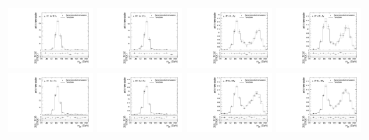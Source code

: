 \begin{figure}[htbp]
  \includegraphics[width=0.2\textwidth]{fig/analysis/templateVsReco_res_r0_MJ_mu_HP_vbf_LDy.pdf}
  \includegraphics[width=0.2\textwidth]{fig/analysis/templateVsReco_res_r0_MJ_e_HP_vbf_LDy.pdf}
  \includegraphics[width=0.2\textwidth]{fig/analysis/templateVsReco_res_r0_MJ_mu_LP_vbf_LDy.pdf}
  \includegraphics[width=0.2\textwidth]{fig/analysis/templateVsReco_res_r0_MJ_e_LP_vbf_LDy.pdf}\\
  \includegraphics[width=0.2\textwidth]{fig/analysis/templateVsReco_res_r0_MJ_mu_HP_bb_HDy.pdf}
  \includegraphics[width=0.2\textwidth]{fig/analysis/templateVsReco_res_r0_MJ_e_HP_bb_HDy.pdf}
  \includegraphics[width=0.2\textwidth]{fig/analysis/templateVsReco_res_r0_MJ_mu_LP_bb_HDy.pdf}
  \includegraphics[width=0.2\textwidth]{fig/analysis/templateVsReco_res_r0_MJ_e_LP_bb_HDy.pdf}\\

\end{figure}
